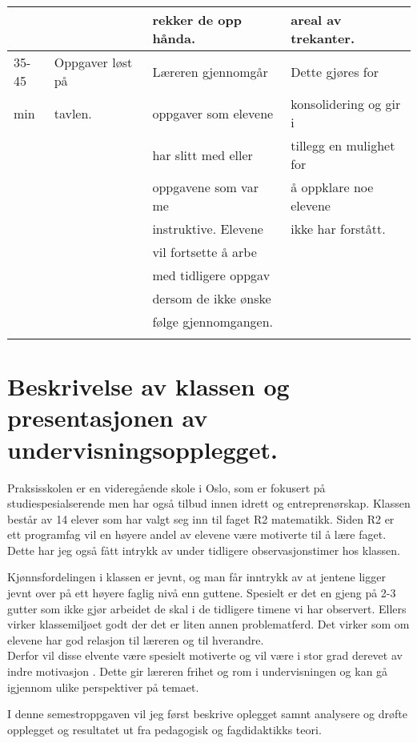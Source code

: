 \documentclass[11pt]{article}
\begin{document}
\begin{center}
\begin{tabular}{l|l|l|l}
 &  & rekker de opp hånda. & areal av trekanter.\\
\hline
35-45 & Oppgaver løst på & Læreren gjennomgår & Dette gjøres for\\
min & tavlen. & oppgaver som elevene & konsolidering og gir i\\
 &  & har slitt med eller & tillegg en mulighet for\\
 &  & oppgavene som var me & å oppklare noe elevene\\
 &  & instruktive. Elevene & ikke har forstått.\\
 &  & vil fortsette å arbe & \\
 &  & med tidligere oppgav & \\
 &  & dersom de ikke ønske & \\
 &  & følge gjennomgangen. & \\
 &  &  & \\
\end{tabular}
\end{center}
\newpage
\section{Beskrivelse av klassen og presentasjonen av undervisningsopplegget.}
\label{sec-1}

Praksisskolen er en videregående skole i Oslo, som er fokusert på studiespesialserende men har også tilbud innen idrett og entreprenørskap. Klassen består av 14 elever som har valgt seg inn til faget R2 matematikk. Siden R2 er ett programfag vil en høyere andel av elevene være motiverte til å lære faget. Dette har jeg også fått intrykk av under tidligere observasjonstimer hos klassen. 

Kjønnsfordelingen i klassen er jevnt, og man får inntrykk av at jentene ligger jevnt over på ett høyere faglig nivå enn guttene. Spesielt er det en gjeng på 2-3 gutter som ikke gjør arbeidet de skal i de tidligere timene vi har observert. Ellers virker klassemiljøet godt der det er liten annen problematferd. Det virker som om elevene har god relasjon til læreren og til hverandre.\\

Derfor vil disse elvente være spesielt motiverte og vil være i stor grad derevet av indre motivasjon \cite{KletteH}. Dette gir læreren frihet og rom i undervisningen og kan gå igjennom ulike perspektiver på temaet.

I denne semestroppgaven vil jeg først beskrive oplegget samnt analysere og drøfte opplegget og resultatet ut fra pedagogisk og fagdidaktikks teori.
\end{document}
